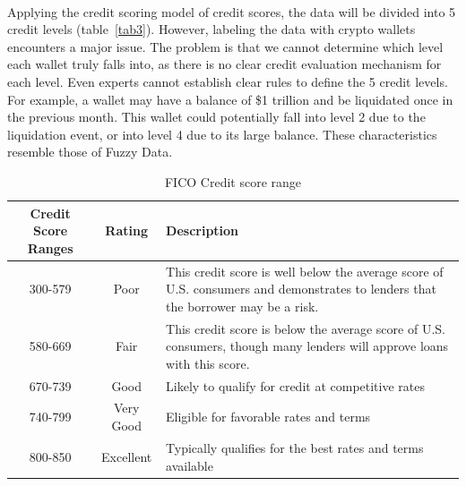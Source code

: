 \documentclass[../ICIT-Paper-2024.tex]{subfiles}
\begin{document}
\paragraph{}

Applying the credit scoring model of credit scores, the data will be divided into 5 credit levels (table~\ref{tab3}). However, labeling the data with crypto wallets encounters a major issue. The problem is that we cannot determine which level each wallet truly falls into, as there is no clear credit evaluation mechanism for each level. Even experts cannot establish clear rules to define the 5 credit levels. For example, a wallet may have a balance of \$1 trillion and be liquidated once in the previous month. This wallet could potentially fall into level 2 due to the liquidation event, or into level 4 due to its large balance. These characteristics resemble those of Fuzzy Data.

\begin{table}[h!]
\caption{FICO Credit score range}
\label{tab:credit_score_ranges}
\centering
\begin{tabular}{|c|c|m{7cm}|}
\hline
\textbf{Credit Score Ranges} & \textbf{Rating} & \textbf{Description} \\ 
\hline
300-579 & Poor & This credit score is well below the average score of U.S. consumers and demonstrates to lenders that the borrower may be a risk. \\ 
\hline
580-669 & Fair & This credit score is below the average score of U.S. consumers, though many lenders will approve loans with this score. \\ 
\hline
670-739 & Good & Likely to qualify for credit at competitive rates \\ 
\hline
740-799 & Very Good & Eligible for favorable rates and terms \\ 
\hline
800-850 & Excellent & Typically qualifies for the best rates and terms available \\ 
\hline 
\end{tabular}
\end{table}
\end{document}
